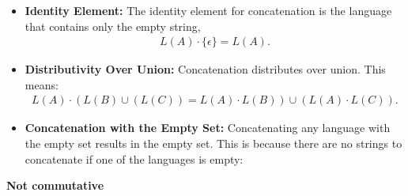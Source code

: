 \documentclass{report}
\begin{document}
\begin{itemize}
\begin{itemize}
            \item \textbf{Identity Element:} The identity element for concatenation is the language that contains only the empty string,
                \begin{align*}
                    L(A)  \cdot \{\epsilon\} = L(A)
                .\end{align*}
            \item \textbf{Distributivity Over Union:} Concatenation distributes over union. This means:
                \begin{align*}
                    L(A) \cdot (L(B) \cup (L(C)) = L(A) \cdot L(B)) \cup (L(A) \cdot L(C))
                .\end{align*}
            \item \textbf{Concatenation with the Empty Set:} Concatenating any language with the empty set results in the empty set. This is because there are no strings to concatenate if one of the languages is empty:
        \end{itemize}
        \bigbreak \noindent 
        \textbf{Not commutative}






    \end{itemize}

        \pagebreak 
\end{document}

